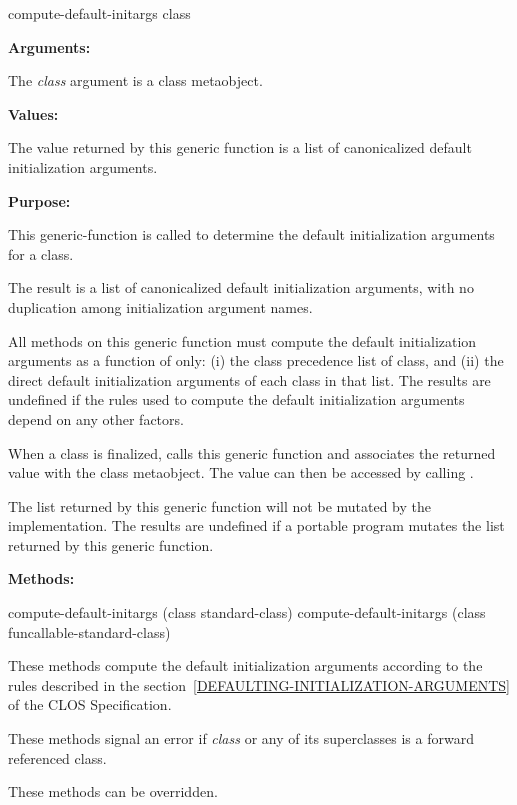 \begin{defun}
compute-default-initargs class

\textbf{Arguments:}

The \emph{class} argument is a class metaobject.

\textbf{Values:}

The value returned by this generic function is a list of canonicalized default
initialization arguments.

\textbf{Purpose:}

This generic-function is called to determine the default initialization
arguments for a class.

The result is a list of canonicalized default initialization arguments, with no
duplication among initialization argument names.

All methods on this generic function must compute the default initialization
arguments as a function of only: (i) the class precedence list of class, and
(ii) the direct default initialization arguments of each class in that list. The
results are undefined if the rules used to compute the default initialization
arguments depend on any other factors.

When a class is finalized,  calls this generic function and
associates the returned value with the class metaobject. The value can then be
accessed by calling .

The list returned by this generic function will not be mutated by the
implementation. The results are undefined if a portable program mutates the list
returned by this generic function.

\textbf{Methods:}

\begin{defun}
compute-default-initargs (class standard-class)
compute-default-initargs (class funcallable-standard-class)

These methods compute the default initialization arguments according to the
rules described in the section~\ref{DEFAULTING-INITIALIZATION-ARGUMENTS} of the
CLOS Specification.

These methods signal an error if \emph{class} or any of its superclasses is a
forward referenced class.

These methods can be overridden.
\end{defun}
\end{defun}

